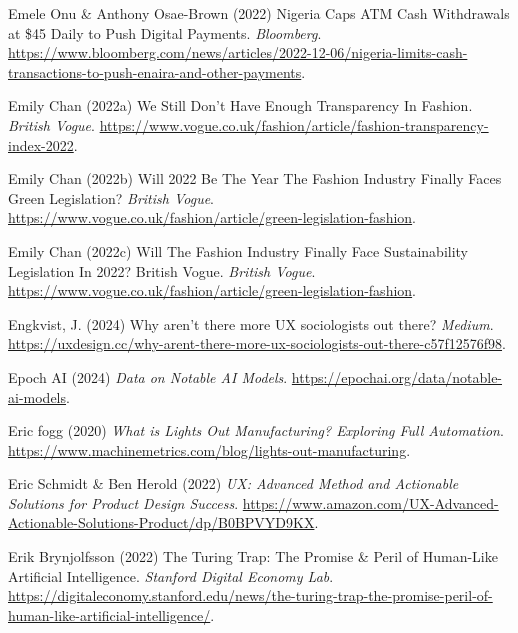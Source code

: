 \documentclass[
  letterpaper,
  DIV=11,
  numbers=noendperiod]{scrartcl}
\newlength{\cslhangindent}
\newenvironment{CSLReferences}[2] %
 {\begin{list}{}{%
  \setlength{\itemindent}{0pt}
  \setlength{\leftmargin}{0pt}
  \setlength{\parsep}{0pt}
  \ifodd #1
   \setlength{\leftmargin}{\cslhangindent}
   \setlength{\itemindent}{-1\cslhangindent}
  \fi
  \setlength{\itemsep}{#2\baselineskip}}}
 {\end{list}}
\begin{document}
\begin{CSLReferences}{0}{1}
Emele Onu \& Anthony Osae-Brown (2022) Nigeria {Caps ATM Cash
Withdrawals} at \$45 {Daily} to {Push Digital Payments}.
\emph{Bloomberg}.
\url{https://www.bloomberg.com/news/articles/2022-12-06/nigeria-limits-cash-transactions-to-push-enaira-and-other-payments}.

Emily Chan (2022a) We {Still Don}'t {Have Enough Transparency In
Fashion}. \emph{British Vogue}.
\url{https://www.vogue.co.uk/fashion/article/fashion-transparency-index-2022}.

Emily Chan (2022b) Will 2022 {Be The Year The Fashion Industry Finally
Faces Green Legislation}? \emph{British Vogue}.
\url{https://www.vogue.co.uk/fashion/article/green-legislation-fashion}.

Emily Chan (2022c) Will {The Fashion Industry Finally Face
Sustainability Legislation In} 2022? {\textbar} {British Vogue}.
\emph{British Vogue}.
\url{https://www.vogue.co.uk/fashion/article/green-legislation-fashion}.

Engkvist, J. (2024) Why aren't there more {UX} sociologists out there?
\emph{Medium}.
\url{https://uxdesign.cc/why-arent-there-more-ux-sociologists-out-there-c57f12576f98}.

Epoch AI (2024) \emph{Data on {Notable AI Models}}.
\url{https://epochai.org/data/notable-ai-models}.

Eric fogg (2020) \emph{What is {Lights Out Manufacturing}? {Exploring
Full Automation}}.
\url{https://www.machinemetrics.com/blog/lights-out-manufacturing}.

Eric Schmidt \& Ben Herold (2022) \emph{{UX}: {Advanced Method} and
{Actionable Solutions} for {Product Design Success}}.
\url{https://www.amazon.com/UX-Advanced-Actionable-Solutions-Product/dp/B0BPVYD9KX}.

Erik Brynjolfsson (2022) The {Turing Trap}: {The Promise} \& {Peril} of
{Human-Like Artificial Intelligence}. \emph{Stanford Digital Economy
Lab}.
\url{https://digitaleconomy.stanford.edu/news/the-turing-trap-the-promise-peril-of-human-like-artificial-intelligence/}.


\end{CSLReferences}
\end{document}
